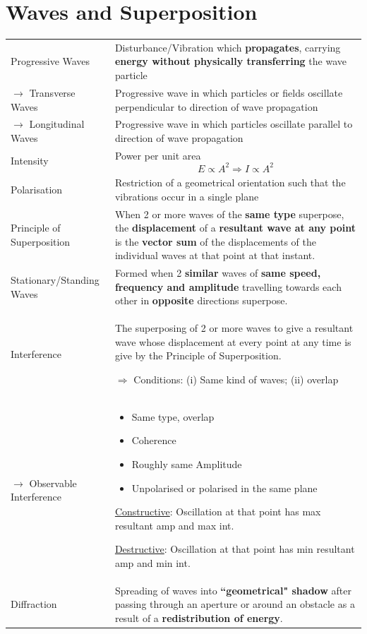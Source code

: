 \documentclass[a4paper,11pt]{article}
\begin{document}
	\section{Waves and Superposition}
	\begin{center}
		\renewcommand{\arraystretch}{1.3}
		\begin{tabular}{@{} l p{10cm} @{}}
			\toprule
			Progressive Waves & Disturbance/Vibration which \textbf{propagates}, carrying \textbf{energy without physically transferring} the wave particle \\
			$\rightarrow$ Transverse Waves & Progressive wave in which particles or fields oscillate perpendicular to direction of wave propagation \\ 
			$\rightarrow$ Longitudinal Waves & Progressive wave in which particles oscillate parallel to direction of wave propagation \\
			Intensity & Power per unit area $$E \propto A^2 \Rightarrow I \propto A^2$$ \vspace*{-\baselineskip}\\
			Polarisation & Restriction of a geometrical orientation such that the vibrations occur in a single plane \\ 
			Principle of Superposition & When 2 or more waves of the \textbf{same type} superpose, the \textbf{displacement} of a \textbf{resultant wave at any point} is the \textbf{vector sum} of the displacements of the individual waves at that point at that instant.\\
			Stationary/Standing Waves & Formed when 2 \textbf{similar} waves of \textbf{same speed, frequency and amplitude} travelling towards each other in \textbf{opposite} directions superpose. \\
			Interference & The superposing of 2 or more waves to give a resultant wave whose displacement at every point at any time is give by the Principle of Superposition. \par $\Rightarrow$ Conditions: (i) Same kind of waves; (ii) overlap\\
			$\rightarrow$ Observable Interference & 
			\begin{minipage}[t]{\textwidth}%
				\begin{itemize}
					\item Same type, overlap
					\item Coherence 
					\item Roughly same Amplitude 
					\item Unpolarised or polarised in the same plane 
				\end{itemize}
			\end{minipage} \par 
			\underline{Constructive}: Oscillation at that point has max resultant amp and max int.\par
			\underline{Destructive}: Oscillation at that point has min resultant amp and min int.\\
			Diffraction & Spreading of waves into \textbf{``geometrical" shadow} after passing through an aperture or around an obstacle as a result of a \textbf{redistribution of energy}. \\
			\bottomrule
		\end{tabular}
	\end{center}
	\newpage
\end{document}
